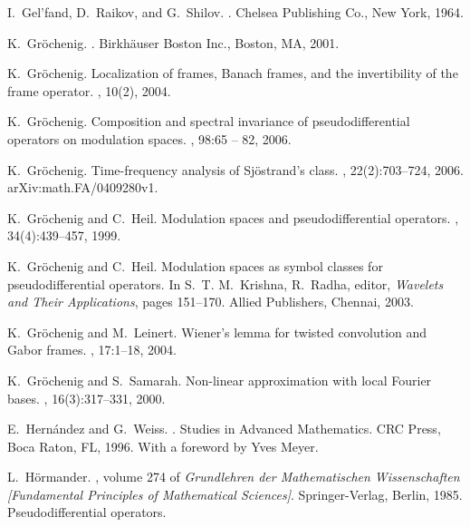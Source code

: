 \documentclass[12pt]{amsart}
\theoremstyle{definition}
\theoremstyle{remark}
\numberwithin{equation}{section}
\begin{document}
\begin{thebibliography}{10}
I.~Gel'fand, D.~Raikov, and G.~Shilov.
.
\newblock Chelsea Publishing Co., New York, 1964.

K.~Gr{\"o}chenig.
.
\newblock Birkh\"auser Boston Inc., Boston, MA, 2001.

K.~Gr{\"o}chenig.
\newblock Localization of frames, {B}anach frames, and the invertibility of the
  frame operator.
, 10(2), 2004.

K.~Gr{\"o}chenig.
\newblock Composition and spectral invariance of pseudodifferential operators
  on modulation spaces.
, 98:65 -- 82, 2006.

K.~Gr\"ochenig.
\newblock Time-frequency analysis of {S}j\"ostrand's class.
, 22(2):703--724, 2006.
\newblock arXiv:math.FA/0409280v1.

K.~Gr{\"o}chenig and C.~Heil.
\newblock Modulation spaces and pseudodifferential operators.
, 34(4):439--457, 1999.

K.~Gr{\"o}chenig and C.~Heil.
\newblock Modulation spaces as symbol classes for pseudodifferential operators.
\newblock In S.~T. M.~Krishna, R.~Radha, editor, {\em Wavelets and Their
  Applications}, pages 151--170. Allied Publishers, Chennai, 2003.

K.~Gr{\"o}chenig and M.~Leinert.
\newblock Wiener's lemma for twisted convolution and {G}abor frames.
, 17:1--18, 2004.

K.~Gr{\"o}chenig and S.~Samarah.
\newblock Non-linear approximation with local {F}ourier bases.
, 16(3):317--331, 2000.

E.~Hern{\'a}ndez and G.~Weiss.
.
\newblock Studies in Advanced Mathematics. CRC Press, Boca Raton, FL, 1996.
\newblock With a foreword by Yves Meyer.

L.~H{\"o}rmander.
,
  volume 274 of {\em Grundlehren der Mathematischen Wissenschaften [Fundamental
  Principles of Mathematical Sciences]}.
\newblock Springer-Verlag, Berlin, 1985.
\newblock Pseudodifferential operators.


\end{thebibliography}
\end{document}
